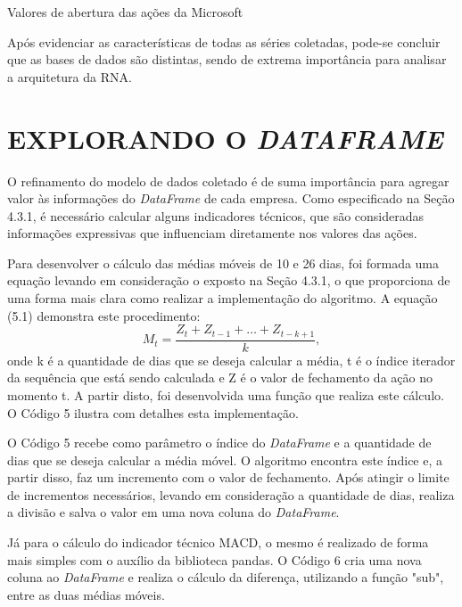 \begin{grafico}[h]
	\centering
	\caption{Valores de abertura das ações da Microsoft}
	\label{lingua}
\end{grafico}

Após evidenciar as características de todas as séries coletadas, pode-se concluir que as bases de dados são distintas, sendo de extrema importância para analisar a arquitetura da RNA.

\section{EXPLORANDO O \textit{DATAFRAME}}
O refinamento do modelo de dados coletado é de suma importância para agregar valor às informações do \textit{DataFrame} de cada empresa. Como especificado na Seção 4.3.1, é necessário calcular alguns indicadores técnicos, que são consideradas informações expressivas que influenciam diretamente nos valores das ações.

Para desenvolver o cálculo das médias móveis de 10 e 26 dias, foi formada uma equação levando em consideração o exposto na Seção 4.3.1, o que proporciona de uma forma mais clara como realizar a implementação do algoritmo. A equação (5.1) demonstra este procedimento:
\begin{equation}\label{eq:MMS}
M_t = \dfrac{Z_t + Z_{t-1} + \dots + Z_{t-k+1}}{k},
\end{equation}
onde k é a quantidade de dias que se deseja calcular a média, t é o índice iterador da sequência que está sendo calculada e Z é o valor de fechamento da ação no momento t. A partir disto, foi desenvolvida uma função que realiza este cálculo. O Código 5 ilustra com detalhes esta implementação. 


O Código 5 recebe como parâmetro o índice do \textit{DataFrame} e a quantidade de dias que se deseja calcular a média móvel. O algoritmo encontra este índice e, a partir disso, faz um incremento com o valor de fechamento. Após atingir o limite de incrementos necessários, levando em consideração a quantidade de dias, realiza a divisão e salva o valor em uma nova coluna do \textit{DataFrame}.

Já para o cálculo do indicador técnico MACD, o mesmo é realizado de forma mais simples com o auxílio da biblioteca pandas. O Código 6 cria uma nova coluna ao \textit{DataFrame} e realiza o cálculo da diferença, utilizando a função "sub", entre as duas médias móveis.



